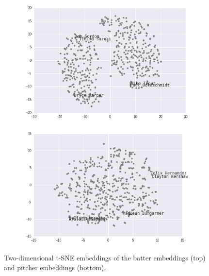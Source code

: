 \documentclass{article}
\begin{document}
\begin{figure}[h]
\captionsetup[subfigure]{labelformat=empty}
\centering

    \begin{subfigure}[b]{0.75\textwidth}
    \includegraphics[width=1\linewidth]{batter_tsne.png}
    \caption{}
    \end{subfigure}

    \begin{subfigure}[b]{0.75\textwidth}
    \includegraphics[width=1\linewidth]{pitcher_tsne.png}
    \caption{}
    \end{subfigure}

\caption{Two-dimensional t-SNE embeddings of the batter embeddings (top) and pitcher embeddings (bottom).}
\label{fig:tsne}
\end{figure}
\end{document}
